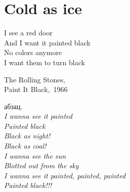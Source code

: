\chapter{Cold as ice} 
\vepsianrose

\setlength{\epigraphwidth}{0.45\textwidth}

\epigraph{%
	I see a red door \\
	And I want it painted black \\
	No colors anymore \\
	I want them to turn black }
	{
	\begin{flushright}
		\small{The Rolling Stones,\\Paint It Black,~1966}
	\end{flushright}
	}


абзац.\\
\textit{
\hspace*{35mm} I wanna see it painted\\
\hspace*{35mm} Painted black\\
\hspace*{35mm} Black as night!\\
\hspace*{35mm} Black as coal!\\
\hspace*{35mm} I wanna see the sun\\
\hspace*{35mm} Blotted out from the sky\\
\hspace*{35mm} I wanna see it painted, painted, painted\\
\hspace*{35mm} Painted black!!!
}
\begin{center}
\end{center}
